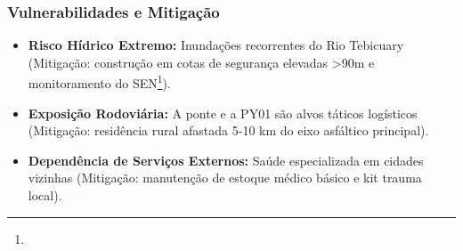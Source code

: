 \subsubsection{Vulnerabilidades e
Mitigação}

\begin{itemize}
\tightlist
\item
  \textbf{Risco Hídrico Extremo:} Inundações recorrentes do Rio
  Tebicuary (Mitigação: construção em cotas de segurança elevadas
  \textgreater90m e monitoramento do SEN\footnote{\fineSEN}).
\item
  \textbf{Exposição Rodoviária:} A ponte e a PY01 são alvos táticos
  logísticos (Mitigação: residência rural afastada 5-10 km do eixo
  asfáltico principal).
\item
  \textbf{Dependência de Serviços Externos:} Saúde especializada em
  cidades vizinhas (Mitigação: manutenção de estoque médico básico e kit
  trauma local).
\end{itemize}

